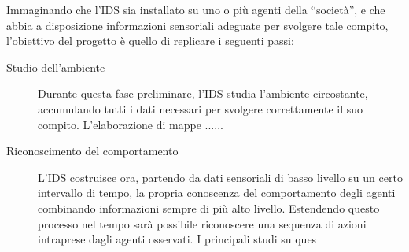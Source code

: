\documentclass[paper=a4, fontsize=11pt]{scrartcl} %
\numberwithin{equation}{section} %
\numberwithin{figure}{section} %
\numberwithin{table}{section} %
\begin{document}
Immaginando che l'IDS sia installato su uno o più agenti della ``società'', e che abbia a disposizione 
informazioni
sensoriali adeguate per svolgere tale compito, l'obiettivo del
progetto è quello di replicare i seguenti passi:
\begin{description}
\item[Studio dell'ambiente] Durante questa fase preliminare, 
l'IDS studia l'ambiente circostante, accumulando tutti i dati
necessari per svolgere correttamente il suo compito. L'elaborazione
di mappe ......

\item[Riconoscimento del comportamento] L'IDS
	costruisce ora, partendo da dati sensoriali di basso livello su 
	un certo intervallo di tempo, la propria
	conoscenza del comportamento degli agenti combinando informazioni 
	sempre di più alto livello. Estendendo questo processo nel tempo
	sarà possibile riconoscere una sequenza di azioni intraprese
	dagli agenti osservati. I principali studi su ques
	

\end{description}
\end{document}
